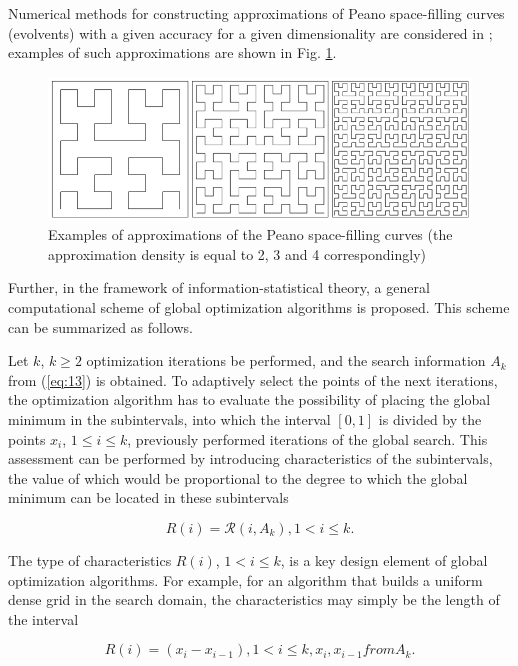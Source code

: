 \documentclass[review]{elsarticle}
\begin{document}
Numerical methods for constructing approximations of Peano space-filling curves (evolvents) with a given accuracy for a given dimensionality are considered in \cite{c5}; examples of such approximations are shown in Fig. \ref{fig:1}.

\begin{figure}
  \centering
  \includegraphics[width=\linewidth]{fig1}
  \caption{Examples of approximations of the Peano space-filling curves (the approximation density is equal to 2, 3 and 4 correspondingly) \cite{c5}}
  \label{fig:1}
\end{figure}

Further, in the framework of information-statistical theory, a general computational scheme of global optimization algorithms is proposed. This scheme can be summarized as follows.

Let $k$, $k \geq 2$ optimization iterations be performed, and the search information $A_k$ from (\ref{eq:13}) is obtained. To adaptively select the points of the next iterations, the optimization algorithm has to evaluate the possibility of placing the global minimum in the subintervals, into which the interval $[0,1]$ is divided by the points $x_i$, $1 \leq i \leq k$, previously performed iterations of the global search. This assessment can be performed by introducing characteristics of the subintervals, the value of which would be proportional to the degree to which the global minimum can be located in these subintervals

\begin{equation}\label{eq:15}
R(i)=\mathcal{R} (i,A_k ), 1 < i \leq k.
\end{equation}

The type of characteristics $R(i)$, $1 < i \leq k$, is a key design element of global optimization algorithms. For example, for an algorithm that builds a uniform dense grid in the search domain, the characteristics may simply be the length of the interval

\begin{equation}\label{eq:16}
R(i)=(x_i-x_{i-1}), 1 < i \leq k, x_i, x_{i-1} from A_k.
\end{equation}
\end{document}
